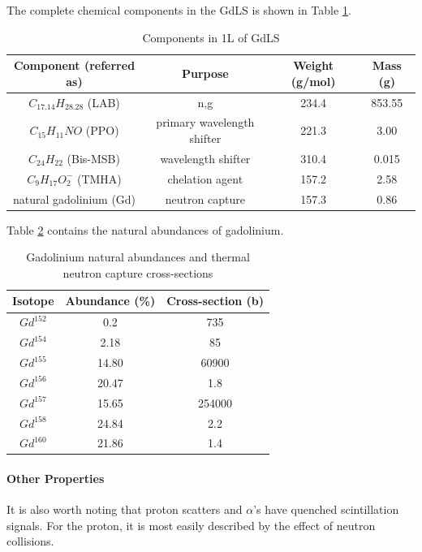 \par
The complete chemical components in the GdLS is shown in Table \ref{tab:GdLS_Components}.

\begin{table}[!htbp]
    \centering
    \begin{tabular}{c | c | c | c}
    \hline
    {Component (referred as)} & {Purpose} & {Weight (g/mol)} & {Mass (g)} \\ \hline
    $C_{17.14}H_{28.28}$ (LAB) & n,g & 234.4  & 853.55 \\
    $C_{15}H_{11}NO$ (PPO) & primary wavelength shifter & 221.3 & 3.00 \\
    $C_{24}H_{22}$ (Bis-MSB) & wavelength shifter & 310.4 & 0.015 \\
    $C_{9}H_{17}O^{-}_{2}$ (TMHA) & chelation agent & 157.2 & 2.58 \\
    natural gadolinium (Gd) & neutron capture & 157.3 & 0.86 
    \end{tabular}
    \caption{Components in 1L of GdLS}
    \label{tab:GdLS_Components}
\end{table} 

\par
Table \ref{tab:Gadolinium_abundances_and_crosssections} contains the natural abundances of gadolinium.

\begin{table}[!htbp]
    \centering
    \begin{tabular}{c | c | c}
    \hline
    {Isotope} & {Abundance (\%)} & {Cross-section (b)} \\ \hline
    $Gd^{152}$ & 0.2 & 735 \\
    $Gd^{154}$ & 2.18 & 85 \\
    $Gd^{155}$ & 14.80 & 60900 \\
    $Gd^{156}$ & 20.47 & 1.8 \\
    $Gd^{157}$ & 15.65 & 254000 \\
    $Gd^{158}$ & 24.84 & 2.2 \\
    $Gd^{160}$ & 21.86 & 1.4

    \end{tabular}
    \caption{Gadolinium natural abundances and thermal neutron capture cross-sections \cite{Gadolinium_abundances_and_crosssection_ref}}
    \label{tab:Gadolinium_abundances_and_crosssections}
\end{table} 

\paragraph{Other Properties}
It is also worth noting that proton scatters and $\alpha$'s have quenched scintillation signals.
For the proton, it is most easily described by the effect of neutron collisions.

